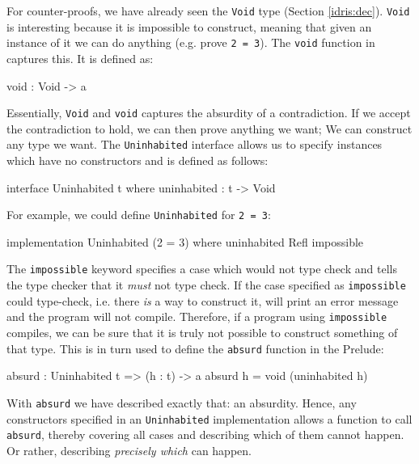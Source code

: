     For counter-proofs, we have already seen the \texttt{Void} type (Section \ref{idris:dec}). \texttt{Void} is interesting because it is impossible to construct, meaning that given an instance of it we can do anything (e.g. prove \texttt{2 = 3}). The \texttt{void} function in \Idris captures this. It is defined as:
    \begin{code}
        void : Void -> a
    \end{code}
    Essentially, \texttt{Void} and \texttt{void} captures the absurdity of a contradiction. If we accept the contradiction to hold, we can then prove anything we want; We can construct any type we want. The \texttt{Uninhabited} interface allows us to specify instances which have no constructors and is defined as follows:
    \begin{code}[caption={The \texttt{Uninhabited} interface \cite{brady_2017}}]
        interface Uninhabited t where
            uninhabited : t -> Void
    \end{code}
    For example, we could define \texttt{Uninhabited} for \texttt{2 = 3}:
    \begin{code}
        implementation Uninhabited (2 = 3) where
            uninhabited Refl impossible
    \end{code}
    The \texttt{impossible} keyword specifies a case which would not type check and tells the \Idris type checker that it \textit{must} not type check. If the case specified as \texttt{impossible} could type-check, i.e. there \textit{is} a way to construct it, \Idris will print an error message and the program will not compile. Therefore, if a program using \texttt{impossible} compiles, we can be sure that it is truly not possible to construct something of that type.
    This is in turn used to define the \texttt{absurd} function in the Prelude:
    \begin{code}[caption={The \texttt{absurd} function  \cite{brady_2017}}]
        absurd : Uninhabited t => (h : t) -> a
        absurd h = void (uninhabited h)
    \end{code}
    With \texttt{absurd} we have described exactly that: an absurdity. Hence, any constructors specified in an \texttt{Uninhabited} implementation allows a function to call \texttt{absurd}, thereby covering all cases and describing which of them cannot happen. Or rather, describing \textit{precisely which} can happen.
    
